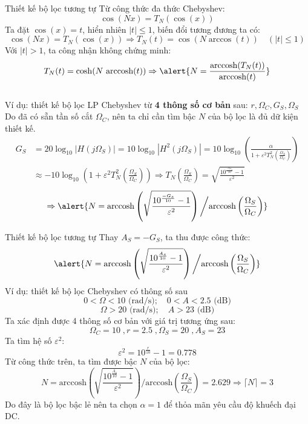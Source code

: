 \documentclass[8pt]{beamer}
\begin{document}
\begin{frame}{Thiết kế bộ lọc tương tự}
Từ công thức đa thức Chebyshev: $$\cos(Nx)=T_{N}(\cos(x))$$
Ta đặt $\cos(x)=t$, hiển nhiên $|t|\leq 1$, biến đổi tương đương ta có:
$$\cos(Nx)=T_{N}(\cos(x))\Rightarrow T_{N}(t)=\cos{(N\arccos(t))}\quad (|t|\leq 1)$$
Với $|t|>1$, ta công nhận không chứng minh: $$T_{N}(t)=\cosh(N\text{ arccosh}{(t)})\Rightarrow \alert{N=\frac{\text{arccosh}(T_{N}(t))}{\text{arccosh}(t)}}$$
\\ Ví dụ: thiết kế bộ lọc LP Chebyshev từ \textbf{4 thông số cơ bản} sau: $r, \Omega_{C}, G_{S},\Omega_{S}$
Do đã có sẵn tần số cắt $\Omega_{C}$, nên ta chỉ cần tìm bậc $N$ của bộ lọc là đủ dữ kiện thiết kế.
\begin{equation*}
\begin{split}
	G_{S}&=20\log_{10}|H(j\Omega_{S})|=10\log_{10}|H^2(j\Omega_{S})|=10\log_{10}\left(\frac{\alpha}{1+\varepsilon^2T^2_{N}\left(\frac{\Omega_{S}}{\Omega_{C}}\right)}\right)\\
	     &\approx -10\log_{10}\left(1+\varepsilon^2T^2_{N}\left(\frac{\Omega_{S}}{\Omega_{C}}\right)\right)\Rightarrow T_{N}\left(\frac{\Omega_{S}}{\Omega_{C}}\right)=\sqrt{\frac{10^{\frac{-G_{s}}{10}}-1}{\varepsilon^2}}
\end{split}
\end{equation*}
$$\Rightarrow \alert{N=\text{arccosh}\left(\sqrt{\frac{10^{\frac{-G_{s}}{10}}-1}{\varepsilon^2}}
\right)\bigg/\text{arccosh}\left(\frac{\Omega_{S}}{\Omega_{C}}\right)}$$
\end{frame}
\begin{frame}{Thiết kế bộ lọc tương tự}
Thay $A_{S}=-G_{S}$, ta thu được công thức:$$\alert{N=\text{arccosh}\left(\sqrt{\frac{10^{\frac{A_{s}}{10}}-1}{\varepsilon^2}}
\right)\bigg/\text{arccosh}\left(\frac{\Omega_{S}}{\Omega_{C}}\right)}$$
Ví dụ: thiết kế bộ lọc Chebyshev có thông số sau
	$$0<\Omega<10\text{ (rad/s)}; \quad 0<A<2.5\text{ (dB)}$$
	$$\Omega>20\text{ (rad/s)}; \quad A>23\text{ (dB)}$$
Ta xác định được 4 thông số cơ bản với giá trị tương ứng sau: 
$$\Omega_{C}=10\;, r=2.5\;, \Omega_{S}=20\;,A_{S}=23$$
Ta tìm hệ số $\varepsilon^2$: $$\varepsilon^2=10^{\frac{r}{10}}-1=0.778$$
Từ công thức trên, ta tìm được bậc $N$ của bộ lọc:
$$N=\text{arccosh}\left(\sqrt{\frac{10^{\frac{A_{s}}{10}}-1}{\varepsilon^2}}
\right)\bigg/\text{arccosh}\left(\frac{\Omega_{S}}{\Omega_{C}}\right)=2.629\Rightarrow \lceil N\rceil =3$$
Do đây là bộ lọc bậc lẻ nên ta chọn $\alpha=1$ để thỏa mãn yêu cầu độ khuếch đại DC.
\end{frame}
\end{document}
